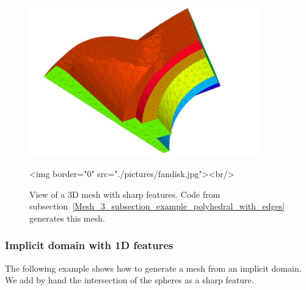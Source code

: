 \begin{figure}[ht]
\begin{center}
 \begin{ccTexOnly}
   \includegraphics[width=10cm]{Mesh_3/pictures/fandisk}
 \end{ccTexOnly}
 \begin{ccHtmlOnly}
   <img border="0" src="./pictures/fandisk.jpg"><br/>
 \end{ccHtmlOnly}
 \caption{View of a 3D mesh with sharp features. Code from
 subsection~\ref{Mesh_3_subsection_example_polyhedral_with_edges} generates this mesh.}
  \label{figure:fandisk_mesh}
\end{center}
\end{figure}


\subsubsection{Implicit domain with 1D features}
The following example shows how to generate a mesh from an implicit
domain. We add by hand the intersection of the spheres as a sharp feature. 


